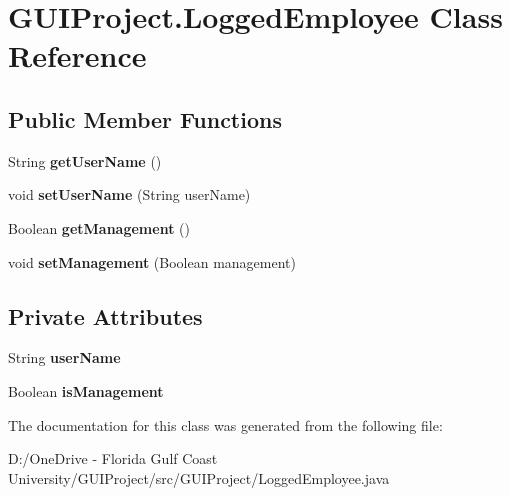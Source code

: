 \hypertarget{class_g_u_i_project_1_1_logged_employee}{}\section{G\+U\+I\+Project.\+Logged\+Employee Class Reference}
\label{class_g_u_i_project_1_1_logged_employee}
\subsection*{Public Member Functions}
\begin{DoxyCompactItemize}
\item 
\mbox{\label{class_g_u_i_project_1_1_logged_employee_a2c8225c7c11e150422bde2504f7ad391}} 
String {\bfseries get\+User\+Name} ()
\item 
\mbox{\label{class_g_u_i_project_1_1_logged_employee_a9da649cc0335189d711b793ca7822163}} 
void {\bfseries set\+User\+Name} (String user\+Name)
\item 
\mbox{\label{class_g_u_i_project_1_1_logged_employee_afa8daccb3fa0adaa21695c24acfda380}} 
Boolean {\bfseries get\+Management} ()
\item 
\mbox{\label{class_g_u_i_project_1_1_logged_employee_ad6b896a66f4081fa4874d047087265f7}} 
void {\bfseries set\+Management} (Boolean management)
\end{DoxyCompactItemize}
\subsection*{Private Attributes}
\begin{DoxyCompactItemize}
\item 
\mbox{\label{class_g_u_i_project_1_1_logged_employee_a612ca5bf1ff46c5d3e6a2ab71d1d18ab}} 
String {\bfseries user\+Name}
\item 
\mbox{\label{class_g_u_i_project_1_1_logged_employee_a1047d44c5e5f8ebc3f4287861edda539}} 
Boolean {\bfseries is\+Management}
\end{DoxyCompactItemize}


The documentation for this class was generated from the following file\+:\begin{DoxyCompactItemize}
\item 
D\+:/\+One\+Drive -\/ Florida Gulf Coast University/\+G\+U\+I\+Project/src/\+G\+U\+I\+Project/Logged\+Employee.\+java\end{DoxyCompactItemize}
